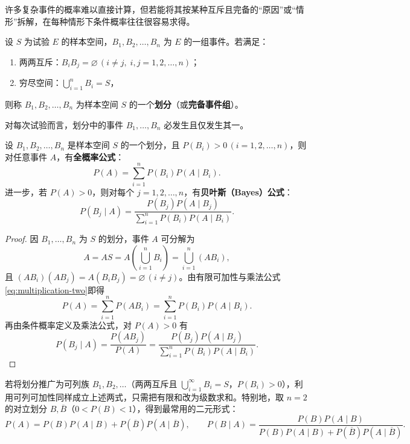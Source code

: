 许多复杂事件的概率难以直接计算，但若能将其按某种互斥且完备的“原因”或“情形”拆解，在每种情形下条件概率往往很容易求得。

\begin{definition}[样本空间的划分]
\label{def:partition}
设 $S$ 为试验 $E$ 的样本空间，$B_1,B_2,\ldots,B_n$ 为 $E$ 的一组事件。若满足：
\begin{enumerate}
  \item 两两互斥：$B_iB_j=\varnothing\,(i\ne j,\;i,j=1,2,\ldots,n)$；
  \item 穷尽空间：$\bigcup_{i=1}^{n}B_i=S$，
\end{enumerate}
则称 $B_1,B_2,\ldots,B_n$ 为样本空间 $S$ 的一个\textbf{划分}（或\textbf{完备事件组}）。
\end{definition}

对每次试验而言，划分中的事件 $B_1,\ldots,B_n$ 必发生且仅发生其一。

\begin{theorem}[全概率公式与贝叶斯公式]
\label{thm:total-bayes}
设 $B_1,B_2,\ldots,B_n$ 是样本空间 $S$ 的一个划分，且 $P(B_i)>0\,(i=1,2,\ldots,n)$，则对任意事件 $A$，有\textbf{全概率公式}：
\begin{equation}
  P(A)=\sum_{i=1}^{n}P(B_i)P(A\mid B_i).
  \label{eq:total-probability}
\end{equation}
进一步，若 $P(A)>0$，则对每个 $j=1,2,\ldots,n$，有\textbf{贝叶斯（Bayes）公式}：
\begin{equation}
  P(B_j\mid A)=\frac{P(B_j)P(A\mid B_j)}{\sum_{i=1}^{n}P(B_i)P(A\mid B_i)}.
  \label{eq:bayes}
\end{equation}
\end{theorem}
\begin{proof}
因 $B_1,\ldots,B_n$ 为 $S$ 的划分，事件 $A$ 可分解为
\[
  A=AS=A\left(\bigcup_{i=1}^{n}B_i\right)=\bigcup_{i=1}^{n}(AB_i),
\]
且 $(AB_i)(AB_j)=A(B_iB_j)=\varnothing\,(i\ne j)$。由有限可加性与乘法公式\eqref{eq:multiplication-two}即得
\[
  P(A)=\sum_{i=1}^{n}P(AB_i)=\sum_{i=1}^{n}P(B_i)P(A\mid B_i).
\]
再由条件概率定义及乘法公式，对 $P(A)>0$ 有
\[
  P(B_j\mid A)=\frac{P(AB_j)}{P(A)}=\frac{P(B_j)P(A\mid B_j)}{\sum_{i=1}^{n}P(B_i)P(A\mid B_i)}.
\]
\end{proof}

若将划分推广为可列族 $B_1,B_2,\ldots$（两两互斥且 $\bigcup_{i=1}^{\infty}B_i=S$，$P(B_i)>0$），利用可列可加性同样成立上述两式，只需把有限和改为级数求和。特别地，取 $n=2$ 的对立划分 $B,\overline{B}$（$0<P(B)<1$），得到最常用的二元形式：
\[
  P(A)=P(B)P(A\mid B)+P(\overline{B})P(A\mid\overline{B}),\qquad
  P(B\mid A)=\frac{P(B)P(A\mid B)}{P(B)P(A\mid B)+P(\overline{B})P(A\mid\overline{B})}.
\]

